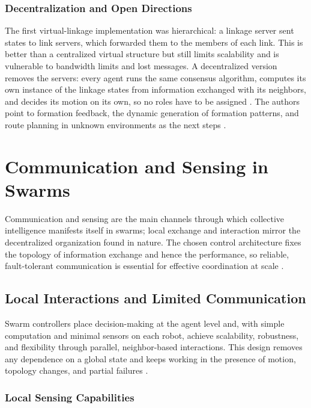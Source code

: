 \subsubsection{Decentralization and Open Directions}

The first virtual-linkage implementation was hierarchical: a linkage server sent
states to link servers, which forwarded them to the members of each link. This
is better than a centralized virtual structure but still limits scalability and
is vulnerable to bandwidth limits and lost messages. A decentralized version
removes the servers: every agent runs the same consensus algorithm, computes its
own instance of the linkage states from information exchanged with its
neighbors, and decides its motion on its own, so no roles have to be assigned
\cite{liu2018decentralization}. The authors point to formation feedback, the
dynamic generation of formation patterns, and route planning in unknown
environments as the next steps \cite{liu2018virtual,liu2018decentralization}.

\section{Communication and Sensing in Swarms}\label{sec:communication}

Communication and sensing are the main channels through which collective
intelligence manifests itself in swarms; local exchange and interaction mirror
the decentralized organization found in nature. The chosen control architecture
fixes the topology of information exchange and hence the performance, so
reliable, fault-tolerant communication is essential for effective coordination
at scale \cite{tan2013research,bhowmick2024bio}.

\subsection{Local Interactions and Limited Communication}

Swarm controllers place decision-making at the agent level and, with simple
computation and minimal sensors on each robot, achieve scalability, robustness,
and flexibility through parallel, neighbor-based interactions. This design
removes any dependence on a global state and keeps working in the presence of
motion, topology changes, and partial failures \cite{dias2021swarm}.

\subsubsection{Local Sensing Capabilities}

